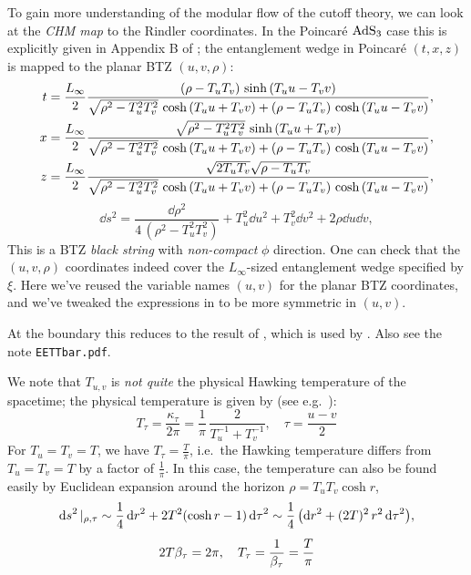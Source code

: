 \documentclass[11pt,a4paper]{article}
\begin{document}
	To gain more understanding of the modular flow of the cutoff theory, we can look at the \textit{CHM map} \cite{Casini:2011kv} to the Rindler coordinates. In the Poincar\'e $\mathrm{AdS}_3$ case this is explicitly given in Appendix B of \cite{Song:2016gtd}; the entanglement wedge in Poincar\'e $(t,x,z)$ is mapped to the planar BTZ $(u,v,\rho)$:
	\begin{equation}
	\begin{aligned}
		t &= \frac{L_\infty}{2} \frac{
				\pqty{\rho - T_u T_v}
				\,\sinh\,(T_u u - T_v v)
			}{
				\sqrt{\rho^2 - T_u^2 T_v^2}
					\,\cosh\,(T_u u + T_v v)
				+ \pqty{\rho - T_u T_v}
					\,\cosh\,(T_u u - T_v v)
			},
	\\
		x &= \frac{L_\infty}{2} \frac{
				\sqrt{\rho^2 - T_u^2 T_v^2}
				\,\sinh\,(T_u u + T_v v)
			}{
				\sqrt{\rho^2 - T_u^2 T_v^2}
					\,\cosh\,(T_u u + T_v v)
				+ \pqty{\rho - T_u T_v}
					\,\cosh\,(T_u u - T_v v)
			},
	\\
		z &= \frac{L_\infty}{2} \frac{
				\sqrt{2T_u T_v}
				\sqrt{\rho - T_u T_v}
			}{
				\sqrt{\rho^2 - T_u^2 T_v^2}
					\,\cosh\,(T_u u + T_v v)
				+ \pqty{\rho - T_u T_v}
					\,\cosh\,(T_u u - T_v v)
			},
	\end{aligned}
	\label{eq:poincare2btz}
	\end{equation}
	\begin{equation}
		\dd{s}^2
		= \frac{\dd{\rho}^2}{4\,(\rho^2 - T_u^2 T_v^2)}
			+ T_u^2 \dd{u}^2
			+ T_v^2 \dd{v}^2
			+ 2\rho \dd{u} \dd{v},
	\end{equation}
	This is a BTZ \textit{black string} with \textit{non-compact} $\phi$ direction. 
	One can check that the $(u,v,\rho)$ coordinates indeed cover the $L_\infty$-sized entanglement wedge specified by $\xi$. 
	Here we've reused the variable names $(u,v)$ for the planar BTZ coordinates, and we've tweaked the expressions in \cite{Song:2016gtd} to be more symmetric in $(u,v)$. 
	
	\noindent{} At the boundary this reduces to the result of \textcite{Casini:2011kv}, which is used by \textcite{Lewkowycz:2019xse}. Also see the note \texttt{EETTbar.pdf}. 
	
	We note that $T_{u,v}$ is \textit{not quite} the physical Hawking temperature of the spacetime; the physical temperature is given by (see e.g.~\cite{Compere:2018aar}):
	\begin{equation}
		T_\tau = \frac{\kappa_\tau}{2\pi}
		= \frac{1}{\pi}\,
			\frac{2}{T_u^{-1} + T_v^{-1}},
	\quad
		\tau = \frac{u - v}{2}
	\end{equation}
	For $T_u = T_v = T$, we have $T_\tau = \frac{T}{\pi}$, i.e.~the Hawking temperature differs from $T_u = T_v = T$ by a factor of $\frac{1}{\pi}$. In this case, the temperature can also be found easily by Euclidean expansion around the horizon $\rho = T_u T_v \cosh r$,
	\begin{gather}
		\dd{s}^2|_{\rho,\tau}
		\sim \frac{1}{4} \dd{r}^2
			+ 2T^2 \pqty{\cosh r - 1}
				\dd{\tau}^2
		\sim \frac{1}{4}\,\pqty{
				\dd{r}^2
				+ (2T)^2\,r^2 \dd{\tau}^2
			},
	\\[1ex]
		2T\beta_\tau = 2\pi,
	\quad
		T_\tau = \frac{1}{\beta_\tau} = \frac{T}{\pi}
	\end{gather}
	
\end{document}
